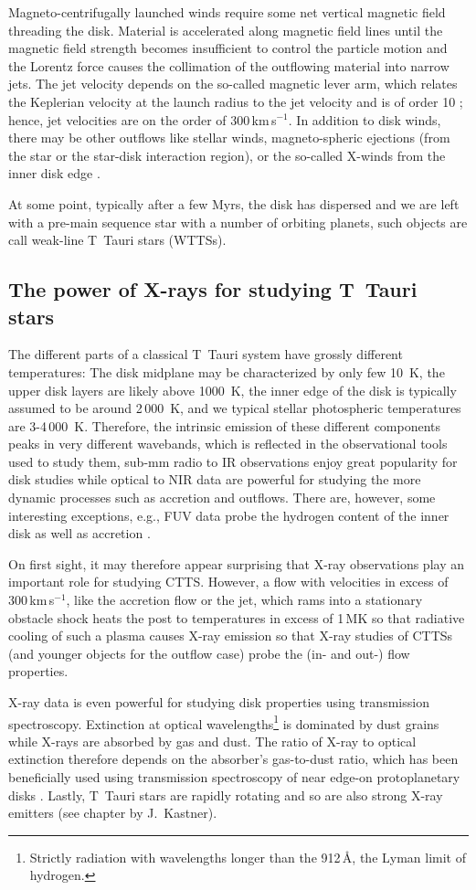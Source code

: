 Magneto-centrifugally launched winds require some net vertical magnetic field threading the disk. Material is accelerated along magnetic field lines until the magnetic field strength becomes insufficient to control the particle motion and the Lorentz force causes the collimation of the outflowing material into narrow jets. The jet velocity depends on the so-called magnetic lever arm, which relates the Keplerian velocity at the launch radius to the jet velocity and is of order 10 \citep{}; hence, jet velocities are on the order of 300\,km\,s$^{-1}$. In addition to disk winds, there may be other outflows like stellar winds, magneto-spheric ejections (from the star or the star-disk interaction region), or the so-called X-winds from the inner disk edge \citep{Shu_}. 

At some point, typically after a few Myrs, the disk has dispersed \citep{} and we are left with a pre-main sequence star with a number of orbiting planets, such objects are call weak-line T~Tauri stars (WTTSs). 

\subsection{The power of X-rays for studying T~Tauri stars}
The different parts of a classical T~Tauri system have grossly different temperatures: The disk midplane may be characterized by only few 10~K, the upper disk layers are likely above 1000~K, the inner edge of the disk is typically assumed to be around 2\,000~K, and we typical stellar photospheric temperatures are 3-4\,000~K. Therefore, the intrinsic emission of these different components peaks in very different wavebands, which is reflected in the observational tools used to study them, sub-mm radio to IR observations enjoy great popularity for disk studies while optical to NIR data are powerful for studying the more dynamic processes such as accretion and outflows. There are, however, some interesting exceptions, e.g., FUV data probe the hydrogen content of the inner disk as well as accretion \citep[see review by][]{Schneider_2020}.

On first sight, it may therefore appear surprising that X-ray observations play an important role for studying CTTS. However, a flow with velocities in excess of 300\,km\,s$^{-1}$, like the accretion flow or the jet, which rams into a stationary obstacle shock heats the post to temperatures in excess of 1\,MK  so that radiative cooling of such a plasma causes X-ray emission so that X-ray studies of CTTSs (and younger objects for the outflow case) probe the (in- and out-) flow properties. 

X-ray data is even powerful for studying disk properties using transmission spectroscopy. Extinction at optical wavelengths\footnote{Strictly radiation with wavelengths longer than the 912\,\AA{}, the Lyman limit of hydrogen.} is dominated by dust grains while X-rays are absorbed by gas and dust. The ratio of X-ray to optical extinction therefore depends on the absorber's gas-to-dust ratio, which has been beneficially used using transmission spectroscopy of near edge-on protoplanetary disks \citep{}. Lastly, T~Tauri stars are rapidly rotating and so are also strong X-ray emitters (see chapter by J.~Kastner).
